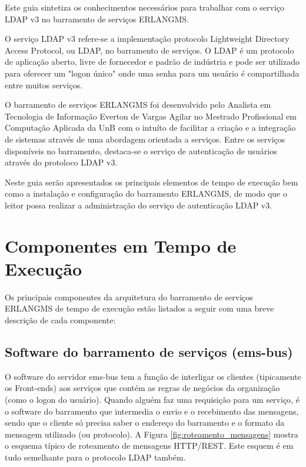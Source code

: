 Este guia sintetiza os conhecimentos necessários para trabalhar
com o serviço LDAP v3 no barramento de serviços ERLANGMS.

O serviço LDAP v3 refere-se a implementação protocolo
Lightweight Directory Access Protocol, ou LDAP, no barramento de serviços.
O LDAP é um protocolo de aplicação aberto, livre de fornecedor e 
padrão de indústria e pode ser utilizado para oferecer
um "logon único" onde uma senha para um usuário é
compartilhada entre muitos serviços.

O barramento de serviços ERLANGMS foi desenvolvido 
pelo Analista em Tecnologia de Informação 
Everton de Vargas Agilar
no Mestrado Profissional em Computação Aplicada da UnB com 
o intuíto de facilitar a criação e a integração de sistemas 
através de uma abordagem orientada a serviços. Entre 
os serviços disponíveis no barramento, destaca-se
o serviço de autenticação de usuários através do protoloco LDAP v3.

Neste guia serão apresentados os principais 
elementos de tempo de execução
bem como a instalação e configuração do barramento ERLANGMS,
de modo que o leitor possa realizar a administração do serviço 
de autenticação LDAP v3.


\section{Componentes em Tempo de Execução}

Os principais componentes da arquitetura do barramento de serviços 
ERLANGMS de tempo de execução 
estão listados a seguir com uma breve descrição de cada componente:


\subsection{Software do barramento de serviços (ems-bus)}

O software do servidor ems-bus tem a função de interligar os clientes (tipicamente os Front-ends) 
aos serviços que contém as regras de negócios da organização (como o logon do usuário). 
Quando alguém faz uma requisição para um serviço, é o software do barramento 
que intermedia o envio e o recebimento das mensagens, sendo que o cliente
só precisa saber o endereço do barramento e o formato da mensagem utilizado (ou protocolo). A 
Figura \ref{fig:roteamento_mensagens} mostra o esquema típico de
roteamento de mensagens HTTP/REST. Este esquem é em tudo semelhante
para o protocolo LDAP também.

